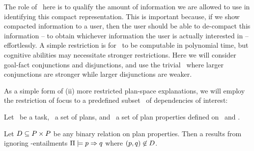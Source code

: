 The role of \entailsuff\ here is to qualify the amount of information
we are allowed to use in identifying this compact representation. This
is important because, if we show compacted information to a user, then
the user should be able to de-compact this information -- to obtain
whichever information the user is actually interested in --
effortlessly. A simple restriction is for \entailsuff\ to be
computable in polynomial time, but cognitive abilities may necessitate
stronger restrictions. Here we will consider goal-fact conjunctions
and disjunctions, and use the trivial \entailsuff\ where larger
conjunctions are stronger while larger disjunctions are weaker.

%
%

As a simple form of (ii) more restricted plan-space explanations, we
will employ the restriction of focus to a predefined subset \deps\ of
dependencies of interest:

\begin{definition}
Let \task\ be a task, \plans\ a set of plans, and \props\ a set of
plan properties defined on \task\ and \plans.

Let $D \subseteq P \times P$ be any binary relation on
plan properties. Then a  results from
ignoring \plans-entailments $\Pi \models p \Rightarrow q$ where
$(p,q) \not\in D$.
\end{definition}

